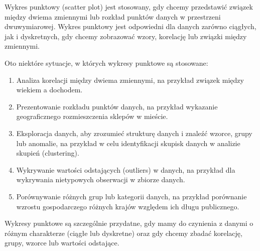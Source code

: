 \documentclass[
  polish,
  letterpaper,
  DIV=11,
  numbers=noendperiod]{scrreprt}
\providecommand{\tightlist}{%
  \setlength{\itemsep}{0pt}\setlength{\parskip}{0pt}}
\begin{document}
Wykres punktowy (scatter plot) jest stosowany, gdy chcemy przedstawić
związek między dwiema zmiennymi lub rozkład punktów danych w przestrzeni
dwuwymiarowej. Wykres punktowy jest odpowiedni dla danych zarówno
ciągłych, jak i dyskretnych, gdy chcemy zobrazować wzory, korelację lub
związki między zmiennymi.

Oto niektóre sytuacje, w których wykresy punktowe są stosowane:

\begin{enumerate}
\def\labelenumi{\arabic{enumi}.}
\tightlist
\item
  Analiza korelacji między dwiema zmiennymi, na przykład związek między
  wiekiem a dochodem.
\item
  Prezentowanie rozkładu punktów danych, na przykład wykazanie
  geograficznego rozmieszczenia sklepów w mieście.
\item
  Eksploracja danych, aby zrozumieć strukturę danych i znaleźć wzorce,
  grupy lub anomalie, na przykład w celu identyfikacji skupisk danych w
  analizie skupień (clustering).
\item
  Wykrywanie wartości odstających (outliers) w danych, na przykład dla
  wykrywania nietypowych obserwacji w zbiorze danych.
\item
  Porównywanie różnych grup lub kategorii danych, na przykład porównanie
  wzrostu gospodarczego różnych krajów względem ich długu publicznego.
\end{enumerate}

Wykresy punktowe są szczególnie przydatne, gdy mamy do czynienia z
danymi o różnym charakterze (ciągłe lub dyskretne) oraz gdy chcemy
zbadać korelację, grupy, wzorce lub wartości odstające.
\end{document}
